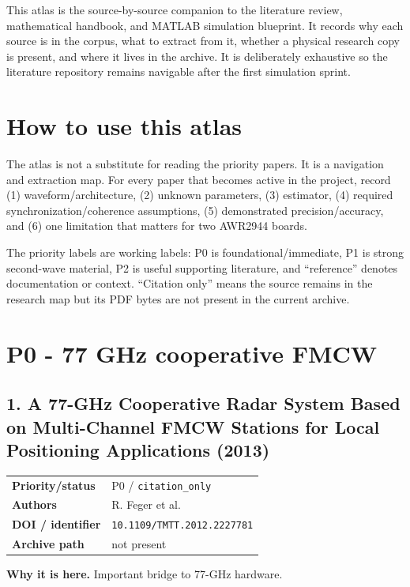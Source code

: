 \documentclass[10.5pt]{article}
\begin{document}
\begin{titlepage}\centering{}\vspace{0.3in}{\Large 84-source map for the Saeed AWR2944 timing project\par}\vspace{0.5in}{\large Summer 2026\par}\vfill\begin{minipage}{0.84\textwidth}\small This atlas is the source-by-source companion to the literature review, mathematical handbook, and MATLAB simulation blueprint. It records why each source is in the corpus, what to extract from it, whether a physical research copy is present, and where it lives in the archive. It is deliberately exhaustive so the literature repository remains navigable after the first simulation sprint.\end{minipage}\end{titlepage}
\tableofcontents\clearpage
\section{How to use this atlas}
The atlas is not a substitute for reading the priority papers. It is a navigation and extraction map. For every paper that becomes active in the project, record (1) waveform/architecture, (2) unknown parameters, (3) estimator, (4) required synchronization/coherence assumptions, (5) demonstrated precision/accuracy, and (6) one limitation that matters for two AWR2944 boards.

The priority labels are working labels: P0 is foundational/immediate, P1 is strong second-wave material, P2 is useful supporting literature, and ``reference'' denotes documentation or context. ``Citation only'' means the source remains in the research map but its PDF bytes are not present in the current archive.
\clearpage
\section{P0 - 77 GHz cooperative FMCW}

\subsection*{1. A 77-GHz Cooperative Radar System Based on Multi-Channel FMCW Stations for Local Positioning Applications (2013)}
\begin{tabularx}{\textwidth}{@{}p{}X@{}}
\textbf{Priority/status} & P0 / \nolinkurl{citation_only} \\
\textbf{Authors} & R. Feger et al. \\
\textbf{DOI / identifier} & \nolinkurl{10.1109/TMTT.2012.2227781} \\
\textbf{Archive path} & not present \\
\end{tabularx}
\textbf{Why it is here.} Important bridge to 77-GHz hardware.
\end{document}
